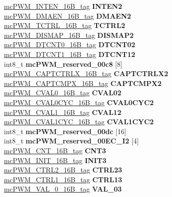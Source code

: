 \begin{DoxyCompactItemize}
\begin{tabbing}
\>\>\mbox{\hyperlink{unionmcPWM__INTEN__16B__tag}{mcPWM\_INTEN\_16B\_tag}} {\bfseries INTEN2}\\
\>\>\mbox{\hyperlink{unionmcPWM__DMAEN__16B__tag}{mcPWM\_DMAEN\_16B\_tag}} {\bfseries DMAEN2}\\
\>\>\mbox{\hyperlink{unionmcPWM__TCTRL__16B__tag}{mcPWM\_TCTRL\_16B\_tag}} {\bfseries TCTRL2}\\
\>\>\mbox{\hyperlink{unionmcPWM__DISMAP__16B__tag}{mcPWM\_DISMAP\_16B\_tag}} {\bfseries DISMAP2}\\
\>\>\mbox{\hyperlink{unionmcPWM__DTCNT0__16B__tag}{mcPWM\_DTCNT0\_16B\_tag}} {\bfseries DTCNT02}\\
\>\>\mbox{\hyperlink{unionmcPWM__DTCNT1__16B__tag}{mcPWM\_DTCNT1\_16B\_tag}} {\bfseries DTCNT12}\\
\>\>int8\_t {\bfseries mcPWM\_reserved\_00c8} \mbox{[}8\mbox{]}\\
\>\>\mbox{\hyperlink{unionmcPWM__CAPTCTRLX__16B__tag}{mcPWM\_CAPTCTRLX\_16B\_tag}} {\bfseries CAPTCTRLX2}\\
\>\>\mbox{\hyperlink{unionmcPWM__CAPTCMPX__16B__tag}{mcPWM\_CAPTCMPX\_16B\_tag}} {\bfseries CAPTCMPX2}\\
\>\>\mbox{\hyperlink{unionmcPWM__CVAL0__16B__tag}{mcPWM\_CVAL0\_16B\_tag}} {\bfseries CVAL02}\\
\>\>\mbox{\hyperlink{unionmcPWM__CVAL0CYC__16B__tag}{mcPWM\_CVAL0CYC\_16B\_tag}} {\bfseries CVAL0CYC2}\\
\>\>\mbox{\hyperlink{unionmcPWM__CVAL1__16B__tag}{mcPWM\_CVAL1\_16B\_tag}} {\bfseries CVAL12}\\
\>\>\mbox{\hyperlink{unionmcPWM__CVAL1CYC__16B__tag}{mcPWM\_CVAL1CYC\_16B\_tag}} {\bfseries CVAL1CYC2}\\
\>\>int8\_t {\bfseries mcPWM\_reserved\_00dc} \mbox{[}16\mbox{]}\\
\>\>int8\_t {\bfseries mcPWM\_reserved\_00EC\_I2} \mbox{[}4\mbox{]}\\
\>\>\mbox{\hyperlink{unionmcPWM__CNT__16B__tag}{mcPWM\_CNT\_16B\_tag}} {\bfseries CNT3}\\
\>\>\mbox{\hyperlink{unionmcPWM__INIT__16B__tag}{mcPWM\_INIT\_16B\_tag}} {\bfseries INIT3}\\
\>\>\mbox{\hyperlink{unionmcPWM__CTRL2__16B__tag}{mcPWM\_CTRL2\_16B\_tag}} {\bfseries CTRL23}\\
\>\>\mbox{\hyperlink{unionmcPWM__CTRL1__16B__tag}{mcPWM\_CTRL1\_16B\_tag}} {\bfseries CTRL13}\\
\>\>\mbox{\hyperlink{unionmcPWM__VAL__0__16B__tag}{mcPWM\_VAL\_0\_16B\_tag}} {\bfseries VAL\_03}\\

\end{tabbing}
\end{DoxyCompactItemize}
